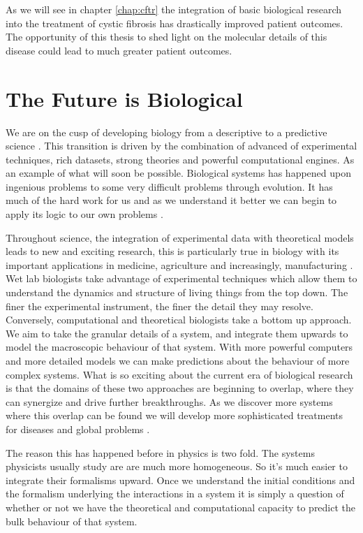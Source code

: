 As we will see in chapter \ref{chap:cftr} the integration of basic biological research into the treatment of cystic fibrosis has drastically improved patient outcomes. The opportunity of this thesis to shed light on the molecular details of this disease could lead to much greater patient outcomes. 

\section{The Future is Biological}
We are on the cusp of developing biology from a descriptive to a predictive science \cite{kochanski1973,liu2005, mogilner2016, covert2021, jumper2021}. This transition is driven by the combination of advanced of experimental techniques, rich datasets, strong theories and powerful computational engines. As an example of what will soon be possible. Biological systems has happened upon ingenious problems to some very difficult problems through evolution. It has much of the hard work for us and as we understand it better we can begin to apply its logic to our own problems \cite{benyus2009}.

Throughout science, the integration of experimental data with theoretical models leads to new and exciting research, this is particularly true in biology with its important applications in medicine, agriculture and increasingly, manufacturing \cite{anonymous2019, scown2022}. Wet lab biologists take advantage of experimental techniques which allow them to understand the dynamics and structure of living things from the top down. The finer the experimental instrument, the finer the detail they may resolve. Conversely, computational and theoretical biologists take a bottom up approach. We aim to take the granular details of a system, and integrate them upwards to model the macroscopic behaviour of that system. With more powerful computers and more detailed models we can make predictions about the behaviour of more complex systems. What is so exciting about the current era of biological research is that the domains of these two approaches are beginning to overlap, where they can synergize  and drive further breakthroughs. As we discover more systems where this overlap can be found we will develop more sophisticated treatments for diseases and global problems \cite{anonymous2019}.

The reason this has happened before in physics is two fold. The systems physicists usually study are are much more homogeneous. So it's much easier to integrate their formalisms upward. Once we understand the initial conditions and the formalism underlying the interactions in a system it is simply a question of whether or not we have the theoretical and computational capacity to predict the bulk behaviour of that system. 

